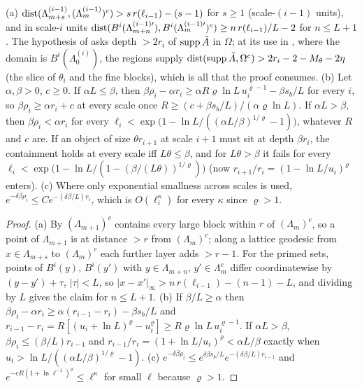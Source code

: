 \begin{lemma}\label{lem:a01:X0}
(a) $\operatorname{dist}(\Lambda^{(i-1)}_{m+s},(\Lambda^{(i-1)}_m)^c)>s\,r(\ell_{i-1})-(s-1)$ for $s\ge1$ (scale-$(i-1)$ units), and in scale-$i$ units $\operatorname{dist}(B^i(\Lambda^{(i-1)\prime}_{m+n}),B^i(\Lambda^{(i-1)\prime}_m)^c)\ge n\,r(\ell_{i-1})/L-2$ for $n\le L+1$. The hypothesis of \cite[Prop.~1]{Ba3} asks depth $>2r_i$ of $\operatorname{supp}\tilde A$ in $\Omega$; at its use in \cite{Ba2}, where the domain is $B^i(\Lambda_0^{(i)})$, the regions supply $\operatorname{dist}(\operatorname{supp}\tilde A,\Omega^c)>2r_i-2-M_\theta-2\eta$ (the slice of $\theta_i$ and the fine blocks), which is all that the proof consumes. (b) Let $\alpha,\beta>0$, $c\ge0$. If $\alpha L\le\beta$, then $\beta\rho_i-\alpha r_i\ge\alpha R\varrho\ln L\,u_i^{\varrho-1}-\beta s_b/L$ for every $i$, so $\beta\rho_i\ge\alpha r_i+c$ at every scale once $R\ge(c+\beta s_b/L)/(\alpha\varrho\ln L)$. If $\alpha L>\beta$, then $\beta\rho_i<\alpha r_i$ for every $\ell_i<\exp\big(1-\ln L/((\alpha L/\beta)^{1/\varrho}-1)\big)$, whatever $R$ and $c$ are. If an object of size $\theta r_{i+1}$ at scale $i+1$ must sit at depth $\beta r_i$, the containment holds at every scale iff $L\theta\le\beta$, and for $L\theta>\beta$ it fails for every $\ell_i<\exp\big(1-\ln L/(1-(\beta/(L\theta))^{1/\varrho})\big)$ (now $r_{i+1}/r_i=(1-\ln L/u_i)^\varrho$ enters). (c) Where only exponential smallness across scales is used, $e^{-\delta\beta\rho_i}\le Ce^{-(\delta\beta/L)r_i}$, which is $O(\ell_i^{\kappa})$ for every $\kappa$ since $\varrho>1$.
\end{lemma}
\begin{proof}
(a) By \cite[(2.8)]{Ba2} $(\Lambda_{m+1})^c$ contains every large block within $r$ of $(\Lambda_m)^c$, so a point of $\Lambda_{m+1}$ is at distance $>r$ from $(\Lambda_m)^c$; along a lattice geodesic from $x\in\Lambda_{m+s}$ to $(\Lambda_m)^c$ each further layer adds $>r-1$. For the primed sets, points of $B^i(y)$, $B^i(y')$ with $y\in\Lambda_{m+n}$, $y'\in\Lambda_m^c$ differ coordinatewise by $(y-y')+\tau$, $|\tau|<L$, so $|x-x'|_\infty>n\,r(\ell_{i-1})-(n-1)-L$, and dividing by $L$ gives the claim for $n\le L+1$. (b) If $\beta/L\ge\alpha$ then $\beta\rho_i-\alpha r_i\ge\alpha(r_{i-1}-r_i)-\beta s_b/L$ and $r_{i-1}-r_i=R[(u_i+\ln L)^\varrho-u_i^\varrho]\ge R\varrho\ln L\,u_i^{\varrho-1}$. If $\alpha L>\beta$, $\beta\rho_i\le(\beta/L)r_{i-1}$ and $r_{i-1}/r_i=(1+\ln L/u_i)^\varrho<\alpha L/\beta$ exactly when $u_i>\ln L/((\alpha L/\beta)^{1/\varrho}-1)$. (c) $e^{-\delta\beta\rho_i}\le e^{\delta\beta s_b/L}e^{-(\delta\beta/L)r_{i-1}}$ and $e^{-cR(1+\ln\ell^{-1})^\varrho}\le\ell^\kappa$ for small $\ell$ because $\varrho>1$.
\end{proof}

